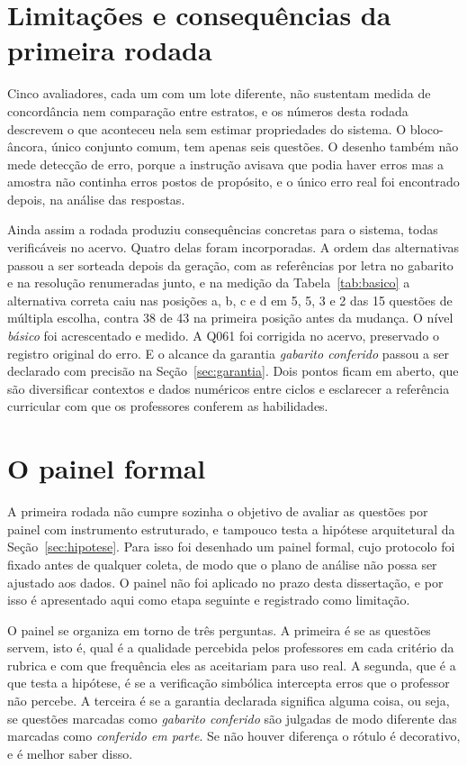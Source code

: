 \section{Limitações e consequências da primeira rodada}
\label{sub:rodada1-limitacoes}

Cinco avaliadores, cada um com um lote diferente, não sustentam medida de concordância nem
comparação entre estratos, e os números desta rodada descrevem o que aconteceu nela sem estimar
propriedades do sistema. O bloco-âncora, único conjunto comum, tem apenas seis questões. O desenho
também não mede detecção de erro, porque a instrução avisava que podia haver erros mas a amostra não
continha erros postos de propósito, e o único erro real foi encontrado depois, na análise das
respostas.

Ainda assim a rodada produziu consequências concretas para o sistema, todas verificáveis no acervo.
Quatro delas foram incorporadas. A ordem das alternativas passou a ser sorteada depois da geração,
com as referências por letra no gabarito e na resolução renumeradas junto, e na medição da
Tabela~\ref{tab:basico} a alternativa correta caiu nas posições a, b, c e d em 5, 5, 3 e 2 das 15
questões de múltipla escolha, contra 38 de 43 na primeira posição antes da mudança. O nível
\emph{básico} foi acrescentado e medido. A Q061 foi corrigida no acervo, preservado o registro
original do erro. E o alcance da garantia \emph{gabarito conferido} passou a ser declarado com
precisão na Seção~\ref{sec:garantia}. Dois pontos ficam em aberto, que são diversificar contextos e
dados numéricos entre ciclos e esclarecer a referência curricular com que os professores conferem as
habilidades.

\section{O painel formal}
\label{sec:painel-formal}

A primeira rodada não cumpre sozinha o objetivo de avaliar as questões por painel com instrumento
estruturado, e tampouco testa a hipótese arquitetural da Seção~\ref{sec:hipotese}. Para isso foi
desenhado um painel formal, cujo protocolo foi fixado antes de qualquer coleta, de modo que o plano
de análise não possa ser ajustado aos dados. O painel não foi aplicado no prazo desta dissertação, e
por isso é apresentado aqui como etapa seguinte e registrado como limitação.

O painel se organiza em torno de três perguntas. A primeira é se as questões servem, isto é, qual é a
qualidade percebida pelos professores em cada critério da rubrica e com que frequência eles as
aceitariam para uso real. A segunda, que é a que testa a hipótese, é se a verificação simbólica
intercepta erros que o professor não percebe. A terceira é se a garantia declarada significa alguma
coisa, ou seja, se questões marcadas como \emph{gabarito conferido} são julgadas de modo diferente
das marcadas como \emph{conferido em parte}. Se não houver diferença o rótulo é decorativo, e é melhor
saber disso.

